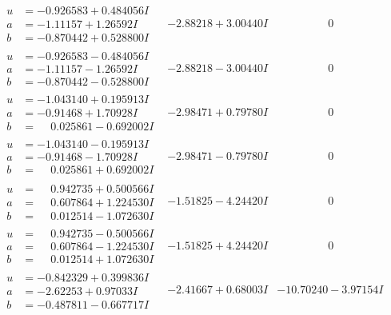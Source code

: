 \documentclass[1p]{elsarticle_modified}
\theoremstyle{definition}
\begin{document}
$$\begin{array}{c|c|c}
\begin{aligned}
u &= -0.926583 + 0.484056 I \\
a &= -1.11157 + 1.26592 I \\
b &= -0.870442 + 0.528800 I\end{aligned}
 & -2.88218 + 3.00440 I & \phantom{-0.000000 } 0 \\ \hline\begin{aligned}
u &= -0.926583 - 0.484056 I \\
a &= -1.11157 - 1.26592 I \\
b &= -0.870442 - 0.528800 I\end{aligned}
 & -2.88218 - 3.00440 I & \phantom{-0.000000 } 0 \\ \hline\begin{aligned}
u &= -1.043140 + 0.195913 I \\
a &= -0.91468 + 1.70928 I \\
b &= \phantom{-}0.025861 - 0.692002 I\end{aligned}
 & -2.98471 + 0.79780 I & \phantom{-0.000000 } 0 \\ \hline\begin{aligned}
u &= -1.043140 - 0.195913 I \\
a &= -0.91468 - 1.70928 I \\
b &= \phantom{-}0.025861 + 0.692002 I\end{aligned}
 & -2.98471 - 0.79780 I & \phantom{-0.000000 } 0 \\ \hline\begin{aligned}
u &= \phantom{-}0.942735 + 0.500566 I \\
a &= \phantom{-}0.607864 + 1.224530 I \\
b &= \phantom{-}0.012514 - 1.072630 I\end{aligned}
 & -1.51825 - 4.24420 I & \phantom{-0.000000 } 0 \\ \hline\begin{aligned}
u &= \phantom{-}0.942735 - 0.500566 I \\
a &= \phantom{-}0.607864 - 1.224530 I \\
b &= \phantom{-}0.012514 + 1.072630 I\end{aligned}
 & -1.51825 + 4.24420 I & \phantom{-0.000000 } 0 \\ \hline\begin{aligned}
u &= -0.842329 + 0.399836 I \\
a &= -2.62253 + 0.97033 I \\
b &= -0.487811 - 0.667717 I\end{aligned}
 & -2.41667 + 0.68003 I & -10.70240 - 3.97154 I \\ \hline\begin{aligned}

\end{aligned}
\end{array}$$
\end{document}
